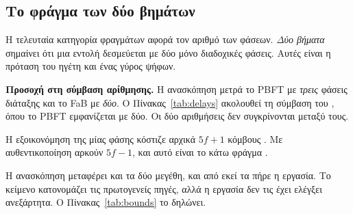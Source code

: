 \subsection{Το φράγμα των δύο βημάτων}

Η τελευταία κατηγορία φραγμάτων αφορά τον αριθμό των φάσεων. \emph{Δύο
βήματα} σημαίνει ότι μια εντολή δεσμεύεται με δύο μόνο διαδοχικές
φάσεις. Αυτές είναι η πρόταση του ηγέτη και ένας γύρος ψήφων.

\textbf{Προσοχή στη σύμβαση αρίθμησης.} Η ανασκόπηση
\cite{amiri2024bedrock} μετρά το PBFT με \emph{τρεις} φάσεις διάταξης
και το FaB με \emph{δύο}. Ο Πίνακας~\ref{tab:delays} ακολουθεί τη
σύμβαση του \cite{malkhi2023hotstuff2}\prep, όπου το PBFT εμφανίζεται με
δύο. Οι δύο αριθμήσεις δεν συγκρίνονται μεταξύ τους.

Η εξοικονόμηση της μίας φάσης κόστιζε αρχικά $5f{+}1$ κόμβους
\cite{martin2006fab}\unver. Με αυθεντικοποίηση αρκούν $5f{-}1$, και αυτό είναι
το κάτω φράγμα \cite{kuznetsov2021optimal,abraham2021goodcase}\unver.

Η ανασκόπηση \cite{amiri2024bedrock} μεταφέρει και τα δύο μεγέθη, και
από εκεί τα πήρε η εργασία. Το κείμενο κατονομάζει τις πρωτογενείς
πηγές, αλλά η εργασία δεν τις έχει ελέγξει ανεξάρτητα. Ο
Πίνακας~\ref{tab:bounds} το δηλώνει.

